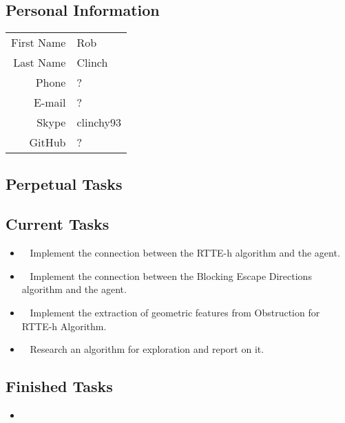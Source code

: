\subsection{Personal Information}
\begin{table}[h!]
	\begin{tabular}{rl}
	First Name 	& Rob\\
	Last Name	& Clinch\\
	Phone		& ?\\
	E-mail		& ?\\
	Skype		& clinchy93\\
	GitHub		& ?
\end{tabular}
\end{table}

\subsection{Perpetual Tasks}

\subsection{Current Tasks}
\begin{itemize}
	\item~
	Implement the connection between the RTTE-h algorithm and the agent.
	\item~
	Implement the connection between the Blocking Escape Directions algorithm and the agent.
	\item~
	Implement the extraction of geometric features from Obstruction for RTTE-h Algorithm.
	\item~
	Research an algorithm for exploration and report on it.
\end{itemize}

\subsection{Finished Tasks}
\begin{itemize}
\item
\end{itemize}
